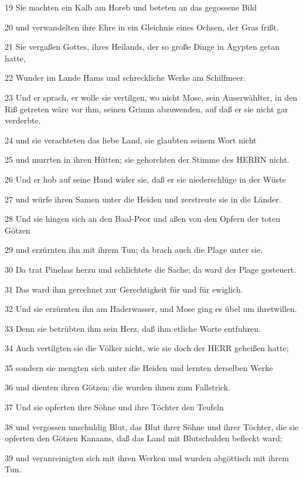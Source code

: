 \par 19 Sie machten ein Kalb am Horeb und beteten an das gegossene Bild
\par 20 und verwandelten ihre Ehre in ein Gleichnis eines Ochsen, der Gras frißt.
\par 21 Sie vergaßen Gottes, ihres Heilands, der so große Dinge in Ägypten getan hatte,
\par 22 Wunder im Lande Hams und schreckliche Werke am Schilfmeer.
\par 23 Und er sprach, er wolle sie vertilgen, wo nicht Mose, sein Auserwählter, in den Riß getreten wäre vor ihm, seinen Grimm abzuwenden, auf daß er sie nicht gar verderbte.
\par 24 und sie verachteten das liebe Land, sie glaubten seinem Wort nicht
\par 25 und murrten in ihren Hütten; sie gehorchten der Stimme des HERRN nicht.
\par 26 Und er hob auf seine Hand wider sie, daß er sie niederschlüge in der Wüste
\par 27 und würfe ihren Samen unter die Heiden und zerstreute sie in die Länder.
\par 28 Und sie hingen sich an den Baal-Peor und aßen von den Opfern der toten Götzen
\par 29 und erzürnten ihn mit ihrem Tun; da brach auch die Plage unter sie.
\par 30 Da trat Pinehas herzu und schlichtete die Sache; da ward der Plage gesteuert.
\par 31 Das ward ihm gerechnet zur Gerechtigkeit für und für ewiglich.
\par 32 Und sie erzürnten ihn am Haderwasser, und Mose ging es übel um ihretwillen.
\par 33 Denn sie betrübten ihm sein Herz, daß ihm etliche Worte entfuhren.
\par 34 Auch vertilgten sie die Völker nicht, wie sie doch der HERR geheißen hatte;
\par 35 sondern sie mengten sich unter die Heiden und lernten derselben Werke
\par 36 und dienten ihren Götzen; die wurden ihnen zum Fallstrick.
\par 37 Und sie opferten ihre Söhne und ihre Töchter den Teufeln
\par 38 und vergossen unschuldig Blut, das Blut ihrer Söhne und ihrer Töchter, die sie opferten den Götzen Kanaans, daß das Land mit Blutschulden befleckt ward;
\par 39 und verunreinigten sich mit ihren Werken und wurden abgöttisch mit ihrem Tun.

